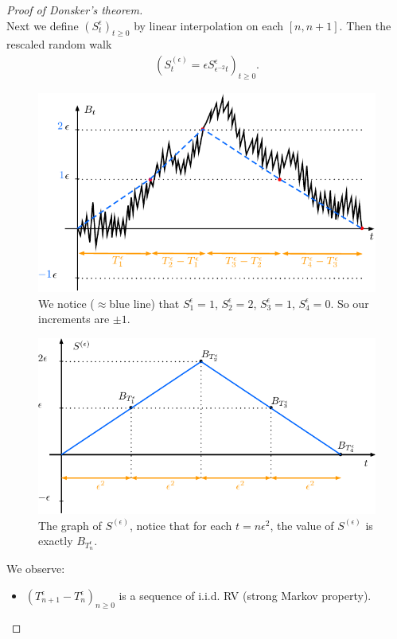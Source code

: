 \documentclass[../mainfile.tex]{subfiles}
\begin{document}
\begin{proof}[Proof of Donsker's theorem]
\\
Next we define $(S_t^\epsilon)_{t \geq 0}$ by linear interpolation on each $[n,n+1]$. Then the rescaled random walk 
\begin{align*}
(S_t^{( \epsilon)} = \epsilon S_{ \epsilon^{-2} t}^\epsilon )_{t \geq 0}. 
\end{align*}
\newpage
\begin{figure}[hbtp]
\centering
\includegraphics[scale=1]{donsker2.pdf}
\caption{We notice ($\approx$blue line) that $S_1^\epsilon = 1$, $S_2^\epsilon = 2$, $S_3^\epsilon =1$, $S_4^\epsilon = 0$. So our increments are $\pm 1$. }
\end{figure}
\begin{figure}[hbtp]
\centering
\includegraphics[scale=.9]{donsker3.pdf}
\caption{The graph of $S^{( \epsilon)}$, notice that for each $t=n \epsilon^2$, the value of $S^{( \epsilon)}$ is exactly $B_{T_n^\epsilon}$. }
\end{figure}
We observe:
\begin{itemize}
\item $(T_{n+1}^\epsilon-T_n^\epsilon)_{n \geq 0}$ is a sequence of i.i.d. RV (strong Markov property).

\end{itemize}
\end{proof}
\end{document}

